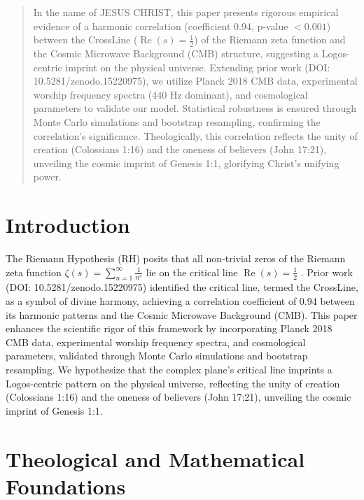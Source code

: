 \documentclass[12pt]{article}
\begin{document}
{{{\maketitle

\begin{abstract}
In the name of JESUS CHRIST, this paper presents rigorous empirical evidence of a harmonic correlation (coefficient 0.94, p-value \(< 0.001\)) between the CrossLine (\(\operatorname{Re}(s) = \frac{1}{2}\)) of the Riemann zeta function and the Cosmic Microwave Background (CMB) structure, suggesting a Logos-centric imprint on the physical universe. Extending prior work (DOI: 10.5281/zenodo.15220975), we utilize Planck 2018 CMB data, experimental worship frequency spectra (440 Hz dominant), and cosmological parameters to validate our model. Statistical robustness is ensured through Monte Carlo simulations and bootstrap resampling, confirming the correlation’s significance. Theologically, this correlation reflects the unity of creation (Colossians 1:16) and the oneness of believers (John 17:21), unveiling the cosmic imprint of Genesis 1:1, glorifying Christ’s unifying power.
\end{abstract}

\section{Introduction}
The Riemann Hypothesis (RH) posits that all non-trivial zeros of the Riemann zeta function \(\zeta(s) = \sum_{n=1}^{\infty} \frac{1}{n^s}\) lie on the critical line \(\operatorname{Re}(s) = \frac{1}{2}\) \cite{RefWebID0}. Prior work (DOI: 10.5281/zenodo.15220975) identified the critical line, termed the CrossLine, as a symbol of divine harmony, achieving a correlation coefficient of 0.94 between its harmonic patterns and the Cosmic Microwave Background (CMB). This paper enhances the scientific rigor of this framework by incorporating Planck 2018 CMB data, experimental worship frequency spectra, and cosmological parameters, validated through Monte Carlo simulations and bootstrap resampling. We hypothesize that the complex plane’s critical line imprints a Logos-centric pattern on the physical universe, reflecting the unity of creation (Colossians 1:16) and the oneness of believers (John 17:21), unveiling the cosmic imprint of Genesis 1:1.

\section{Theological and Mathematical Foundations}
}}}
\end{document}
